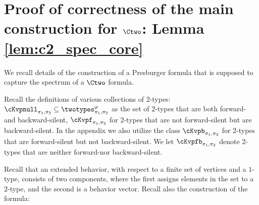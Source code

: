 \section*{Proof of correctness of the main construction for $\Ctwo$: Lemma \ref{lem:c2_spec_core}} \label{app:ctwoproof}

We recall details of
the construction of a Presburger formula that is supposed to capture the spectrum of a $\Ctwo$ formula.

Recall the definitions of various collections of $2$-types:
$\cKvpnull_{\pi_1, \pi_2} \subseteq \twotypes^\varphi_{\pi_1, \pi_2}$ as the set of 2-types that are both forward- and backward-silent,
$\cKvpf_{\pi_1, \pi_2}$ for 2-types that are not forward-silent but are backward-silent.
In the appendix we also utilize the class
$\cKvpb_{\pi_1, \pi_2}$ for 2-types that are forward-silent but not backward-silent. We let
$\cKvpfb_{\pi_1, \pi_2}$ denote 2-types that are neither forward-nor backward-silent.

Recall that an extended behavior, with respect to a finite set of vertices and a $1$-type, consists of two components, where the first assigns elements in the set to a $2$-type, and the second is a behavior vector. 
Recall also the construction of the formula:

